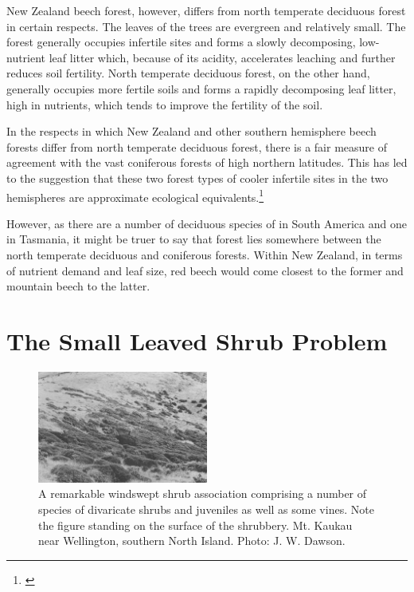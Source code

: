 New Zealand beech forest, however, differs from north temperate deciduous forest in certain respects.
The leaves of the trees are evergreen and relatively small.
The forest generally occupies infertile sites and forms a slowly decomposing, low-nutrient leaf litter which, because of its acidity, accelerates leaching and further reduces soil fertility.
North temperate deciduous forest, on the other hand, generally occupies more fertile soils and forms a rapidly decomposing leaf litter, high in nutrients, which tends to improve the fertility of the soil.

In the respects in which New Zealand and other southern hemisphere beech forests differ from north temperate deciduous forest, there is a fair measure of agreement with the vast coniferous forests of high northern latitudes.
This has led to the suggestion that these two forest types of cooler infertile sites in the two hemispheres are approximate ecological equivalents.\footnote{\cite{dansereau1964six}}

However, as there are a number of deciduous species of  in South America and one in Tasmania, it might be truer to say that  forest lies somewhere between the north temperate deciduous and coniferous forests.
Within New Zealand, in terms of nutrient demand and leaf size, red beech would come closest to the former and mountain beech to the latter.

\chapter{The Small Leaved Shrub Problem}

\begin{figure}
	\includegraphics[width=0.5\textwidth]{graphics/figure74shrubs.jpg}
	\centering
	\caption[A remarkable windswept shrub association]{A remarkable windswept shrub association comprising a number of species of divaricate shrubs and juveniles as well as some vines.
    Note the figure standing on the surface of the shrubbery.
    Mt. Kaukau near Wellington, southern North Island.
	Photo: J. W. Dawson.}
	\label{fig:74shrubs}
\end{figure}


